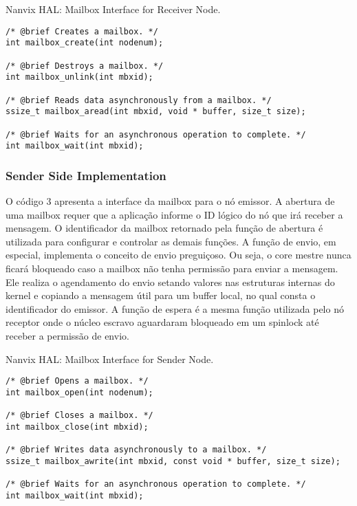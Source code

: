\begin{listing}[!tb]
\caption{Nanvix HAL: Mailbox Interface for Receiver Node.}
\label{code:hal-mailbox-receiver}
\begin{verbatim}
/* @brief Creates a mailbox. */
int mailbox_create(int nodenum);

/* @brief Destroys a mailbox. */
int mailbox_unlink(int mbxid);

/* @brief Reads data asynchronously from a mailbox. */
ssize_t mailbox_aread(int mbxid, void * buffer, size_t size);

/* @brief Waits for an asynchronous operation to complete. */
int mailbox_wait(int mbxid);
\end{verbatim}
\end{listing}

			\subsubsection{Sender Side Implementation}

				O código 3 apresenta a interface da mailbox para o nó emissor.
				A abertura de uma mailbox requer que a aplicação informe o ID lógico do nó que irá receber a mensagem.
				O identificador da mailbox retornado pela função de abertura é utilizada para configurar e controlar as demais funções.
				A função de envio, em especial, implementa o conceito de envio preguiçoso.
				Ou seja, o core mestre nunca ficará bloqueado caso a mailbox não tenha permissão para enviar a mensagem.
				Ele realiza o agendamento do envio setando valores nas estruturas internas do kernel e copiando a mensagem útil para um buffer local, no qual consta o identificador do emissor.
				A função de espera é a mesma função utilizada pelo nó receptor onde o núcleo escravo aguardaram bloqueado em um spinlock até receber a permissão de envio.


\begin{listing}[!tb]
\caption{Nanvix HAL: Mailbox Interface for Sender Node.}
\label{code:hal-mailbox-sender}
\begin{verbatim}
/* @brief Opens a mailbox. */
int mailbox_open(int nodenum);

/* @brief Closes a mailbox. */
int mailbox_close(int mbxid);

/* @brief Writes data asynchronously to a mailbox. */
ssize_t mailbox_awrite(int mbxid, const void * buffer, size_t size);

/* @brief Waits for an asynchronous operation to complete. */
int mailbox_wait(int mbxid);
\end{verbatim}
\end{listing}

